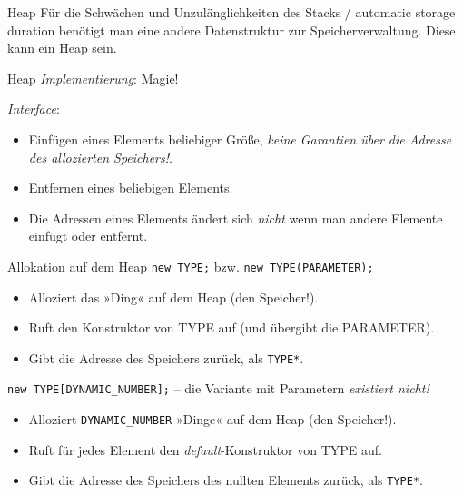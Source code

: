 \begin{frame}{Heap}
	Für die Schwächen und Unzulänglichkeiten des Stacks / automatic storage duration benötigt man eine andere Datenstruktur zur Speicherverwaltung.
	Diese kann ein Heap sein.
	
	\pause
	
	\begin{block}{Heap}
		\emph{Implementierung}: Magie!
		
		\pause
		
		\emph{Interface}:
		\begin{itemize}
			\item Einfügen eines Elements beliebiger Größe, \emph{keine Garantien über die Adresse des allozierten Speichers!}.
			\item Entfernen eines beliebigen Elements.
			\item Die Adressen eines Elements ändert sich \emph{nicht} wenn man andere Elemente einfügt oder entfernt.
		\end{itemize}
	\end{block}
\end{frame}

\begin{frame}[fragile]{Allokation auf dem Heap}
	\verb|new TYPE;| bzw. \verb|new TYPE(PARAMETER);|
	\begin{itemize}
		\item Alloziert das »Ding« auf dem Heap (den Speicher!).
		\item Ruft den Konstruktor von TYPE auf (und übergibt die PARAMETER).
		\item Gibt die Adresse des Speichers zurück, als \verb|TYPE*|.
	\end{itemize}
	
	\hspace*{3em}
	
	\verb|new TYPE[DYNAMIC_NUMBER];| -- die Variante mit Parametern \emph{existiert nicht!}
	\begin{itemize}
		\item Alloziert \verb|DYNAMIC_NUMBER| »Dinge« auf dem Heap (den Speicher!).
		\item Ruft für jedes Element den \emph{default}-Konstruktor von TYPE auf.
		\item Gibt die Adresse des Speichers des nullten Elements zurück, als \verb|TYPE*|.
	\end{itemize}
\end{frame}

